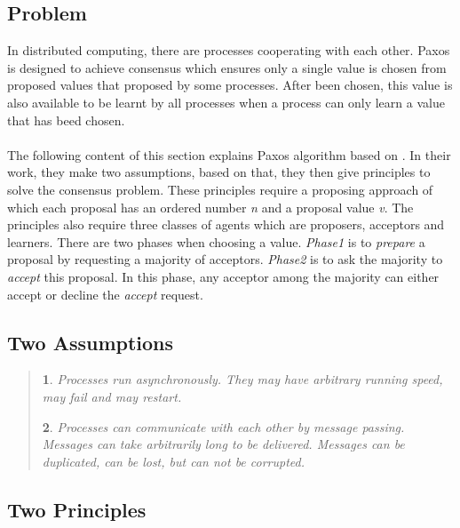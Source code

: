 \documentclass[12pt, a4paper]{article}
\makeatletter
\newtheorem*{assumption*}{\assumptionnumber}
\providecommand{\assumptionnumber}{}
\newenvironment{assumption}[2]
 {
  \renewcommand{\assumptionnumber}{Assumption #1}
  \begin{assumption*}%
  \protected@edef\@currentlabel{#1}
 }
 {
  \end{assumption*}
 }
\makeatother
\begin{document}
\subsection{Problem}
In distributed computing, there are processes cooperating with each other. 
Paxos is designed to achieve consensus which ensures 
only a single value is chosen from proposed values that 
proposed by some processes\cite{fischer1983consensus}. 
After been chosen, this value is also available to be learnt by all processes
when a process can only learn a value that has beed chosen.

\paragraph{}
The following content of this section explains 
Paxos algorithm based on \cite{fischer1983consensus}. 
In their work, they make two assumptions, 
based on that, they then give principles to solve the consensus problem. 
These principles require a proposing approach 
of which each proposal has an ordered number \textit{n} 
and a proposal value \textit{v}. 
The principles also require three classes of agents 
which are proposers, acceptors and learners. 
There are two phases when choosing a value.
\textit{Phase1} is to \textit{prepare} a proposal 
by requesting a majority of acceptors. 
\textit{Phase2} is to ask the majority to \textit{accept} this proposal.
In this phase, any acceptor among the majority can 
either accept or decline the \textit{accept} request.

\subsection{Two Assumptions}
\begin{quote}
  \begin{assumption}{1}{F}\label{as:1}
    Processes run asynchronously. 
    They may have arbitrary running speed, may fail and may restart.
  \end{assumption}
  \begin{assumption}{2}{F}\label{as:2}
    Processes can communicate with each other by message passing. 
    Messages can take arbitrarily long to be delivered. 
    Messages can be duplicated, can be lost, but can not be corrupted.
  \end{assumption}
\end{quote}
\subsection{Two Principles}
\end{document}
